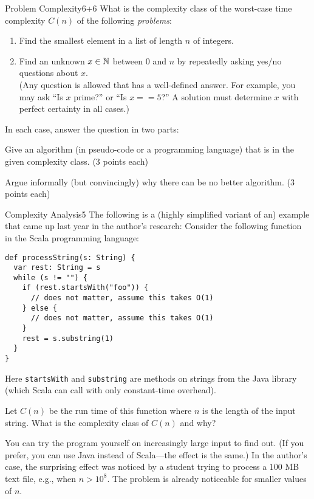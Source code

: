 \documentclass[a4paper]{article}
\begin{document}
\header

\begin{problem}{Problem Complexity}{6+6}
What is the complexity class of the worst-case time complexity $C(n)$ of the following \emph{problems}:
\begin{enumerate}
\item Find the smallest element in a list of length $n$ of integers.
\item Find an unknown $x\in \mathbb{N}$ between $0$ and $n$ by repeatedly asking yes/no questions about $x$.\\
(Any question is allowed that has a well-defined answer. For example, you may ask ``Is $x$ prime?'' or ``Is $x==5$?'' A solution must determine $x$ with perfect certainty in all cases.)
\end{enumerate}

In each case, answer the question in two parts:
\begin{compactitem}
\item Give an algorithm (in pseudo-code or a programming language) that is in the given complexity class. (3 points each)
\item Argue informally (but convincingly) why there can be no better algorithm. (3 points each)
\end{compactitem}
\end{problem}

\begin{problem}{Complexity Analysis}{5}
The following is a (highly simplified variant of an) example that came up last year in the author's research:
Consider the following function in the Scala programming language:

\begin{lstlisting}
def processString(s: String) {
  var rest: String = s
  while (s != "") {
    if (rest.startsWith("foo")) {
      // does not matter, assume this takes O(1)
    } else {
      // does not matter, assume this takes O(1)
    }
    rest = s.substring(1)
  }
}
\end{lstlisting}
Here \lstinline|startsWith| and \lstinline|substring| are methods on strings from the Java library (which Scala can call with only constant-time overhead).

Let $C(n)$ be the run time of this function where $n$ is the length of the input string.
What is the complexity class of $C(n)$ and why?

You can try the program yourself on increasingly large input to find out. (If you prefer, you can use Java instead of Scala---the effect is the same.)
In the author's case, the surprising effect was noticed by a student trying to process a $100$ MB text file, e.g., when $n>10^8$. The problem is already noticeable for smaller values of $n$.
\end{problem}
\end{document}

